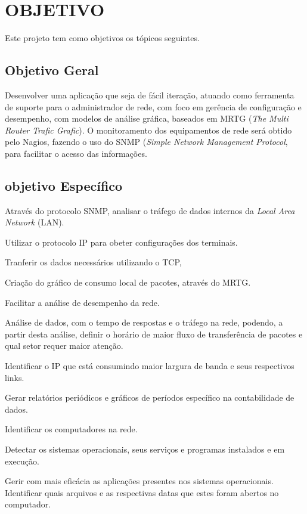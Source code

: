 \chapter{OBJETIVO}

\par Este projeto tem como objetivos os tópicos seguintes.

\section{Objetivo Geral}

\par Desenvolver uma aplicação que seja de fácil iteração, atuando como ferramenta de suporte
para o administrador de rede, com foco em gerência de configuração e desempenho, com
modelos de análise gráfica, baseados em MRTG (\textit{The Multi Router Trafic
Grafic}). O monitoramento dos equipamentos de rede será obtido pelo Nagios,
fazendo o uso do SNMP (\textit{Simple Network Management Protocol}, para
facilitar o acesso das informações.

\section{objetivo Específico}

\par Através do protocolo SNMP, analisar o tráfego de dados internos da
\textit{Local Area Network} (LAN).

\par Utilizar o protocolo IP para obeter configurações dos terminais.

\par Tranferir os dados necessários utilizando o TCP,

\par Criação do gráfico de consumo local de pacotes, através do MRTG.

\par Facilitar a análise de desempenho da rede.

\par Análise de dados, com o tempo de respostas e o tráfego na rede, podendo, a
partir desta análise, definir o horário de maior fluxo de transferência de pacotes e qual setor requer maior
atenção.

\par Identificar o IP que está consumindo maior largura de banda e seus
respectivos links.

\par Gerar relatórios periódicos e gráficos de períodos específico na
contabilidade de dados.

\par Identificar os computadores na rede.

\par Detectar os sistemas operacionais, seus serviços e programas instalados e
em execução.

\par Gerir com mais eficácia as aplicações presentes nos sistemas operacionais.
Identificar quais arquivos e as respectivas datas que estes foram abertos no computador.